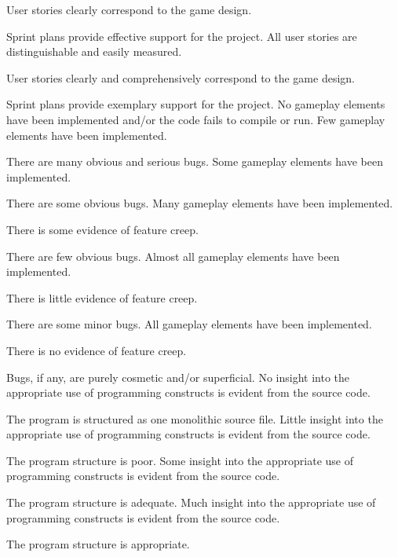 \documentclass{../fal_assignment}
\begin{document}
\begin{markingrubric}
            \par User stories clearly correspond to the game design.
            \par Sprint plans provide effective support for the project.
        \grade All user stories are distinguishable and easily measured.
            \par User stories clearly and comprehensively correspond to the game design.
            \par Sprint plans provide exemplary support for the project.
        \grade\fail No gameplay elements have been implemented and/or the code fails to compile or run.
        \grade Few gameplay elements have been implemented.
            \par There are many obvious and serious bugs.
        \grade Some gameplay elements have been implemented.
            \par There are some obvious bugs.
        \grade Many gameplay elements have been implemented.
            \par There is some evidence of feature creep.
            \par There are few obvious bugs.
        \grade Almost all gameplay elements have been implemented.
            \par There is little evidence of feature creep.
            \par There are some minor bugs.
        \grade All gameplay elements have been implemented.
            \par There is no evidence of feature creep.
            \par Bugs, if any, are purely cosmetic and/or superficial.
        \grade\fail No insight into the appropriate use of programming constructs is evident from the source code.
            \par The program is structured as one monolithic source file.
        \grade Little insight into the appropriate use of programming constructs is evident from the source code.
            \par The program structure is poor.
        \grade Some insight into the appropriate use of programming constructs is evident from the source code.
            \par The program structure is adequate.
        \grade Much insight into the appropriate use of programming constructs is evident from the source code.
            \par The program structure is appropriate.

\end{markingrubric}
\end{document}
